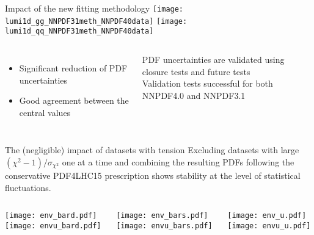\begin{frame}[t]{Impact of the new fitting methodology}
	\texttt{[image: lumi1d\_gg\_NNPDF31meth\_NNPDF40data]}
	\texttt{[image: lumi1d\_qq\_NNPDF31meth\_NNPDF40data]}
	\begin{columns}
			\begin{itemize}
	    	        \item Significant reduction of PDF uncertainties
		        \item Good agreement between the central values
		    \end{itemize}
            \begin{block}{}
                \fontsize{7}{6}\selectfont
                PDF uncertainties are validated using closure tests and future tests\\
                Validation tests successful for both NNPDF4.0 and NNPDF3.1 
            \end{block}
    \end{columns}
\end{frame}



\begin{frame}{The (negligible) impact of datasets with tension}
    Excluding datasets with large $({\chi^{2}-1})/{\sigma_{\chi^{2}}}$ one at a time and combining the resulting PDFs following the conservative PDF4LHC15 prescription shows stability at the level of statistical fluctuations.
    \begin{columns}
        \begin{column}[T]{0.32\textwidth}
            \centering
            \texttt{[image: env\_bard.pdf]}\\
            \texttt{[image: envu\_bard.pdf]}
        \end{column}
        \begin{column}[T]{0.32\textwidth}
            \centering
            \texttt{[image: env\_bars.pdf]}\\
            \texttt{[image: envu\_bars.pdf]}
        \end{column}
        \begin{column}[T]{0.32\textwidth}
            \centering
            \texttt{[image: env\_u.pdf]}\\
            \texttt{[image: envu\_u.pdf]}
        \end{column}
    \end{columns}
\end{frame}


